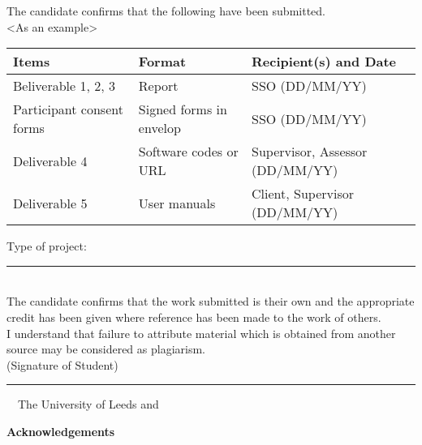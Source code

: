\frontcover

\clearpage
\noindent The candidate confirms that the following have been submitted.\\
<As an example>
\begin{table}[ht!]
\begin{tabular}{|p{}|p{}|p{}|}
\hline 
Items & Format & Recipient(s) and Date \\ 
\hline 
Beliverable 1, 2, 3 & Report & SSO (DD/MM/YY) \\ 
\hline 
Participant consent forms & Signed forms in envelop & SSO (DD/MM/YY) \\ 
\hline 
Deliverable 4 & Software codes or URL & Supervisor, Assessor (DD/MM/YY) \\ 
\hline 
Deliverable 5 & User manuals & Client, Supervisor (DD/MM/YY) \\ 
\hline 
\end{tabular} 
\end{table}

\noindent Type of project: \rule{100mm}{1pt}
\vspace{\fill}\\
\noindent The candidate confirms that the work submitted is their own and the appropriate credit has been given where reference has been made to the work of others.
\vspace{\fill}\\
\noindent I understand that failure to attribute material which is obtained from another source may be considered as plagiarism.
\vspace{\fill}\\
\flushright(Signature of Student) \rule{50mm}{1pt}
\flushleft
\vspace{\fill}
\textcopyright~\session~The University of Leeds and~\fullname

\begin{dissertationsummary}

\end{dissertationsummary}

\clearpage
\centering\textbf{Acknowledgements}
\flushleft


\tableofcontents


